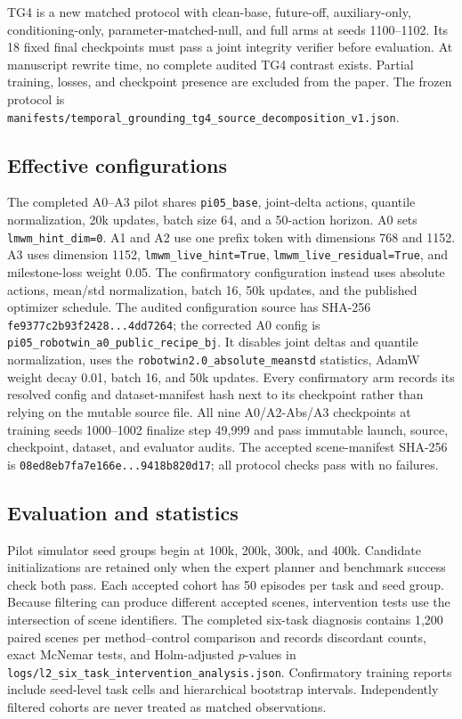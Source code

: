 TG4 is a new matched protocol with clean-base, future-off, auxiliary-only,
conditioning-only, parameter-matched-null, and full arms at seeds 1100--1102.
Its 18 fixed final checkpoints must pass a joint integrity verifier before
evaluation.  At manuscript rewrite time, no complete audited TG4 contrast
exists.  Partial training, losses, and checkpoint presence are excluded from
the paper.  The frozen protocol is
\texttt{manifests/temporal\_grounding\_tg4\_source\_decomposition\_v1.json}.

\subsection{Effective configurations}
The completed A0--A3 pilot shares \texttt{pi05\_base}, joint-delta actions,
quantile normalization, 20k updates, batch size 64, and a 50-action horizon.
A0 sets \texttt{lmwm\_hint\_dim=0}.  A1 and A2 use one prefix token with
dimensions 768 and 1152.  A3 uses dimension 1152,
\texttt{lmwm\_live\_hint=True}, \texttt{lmwm\_live\_residual=True}, and
milestone-loss weight 0.05.  The confirmatory configuration instead uses
absolute actions, mean/std normalization, batch 16, 50k updates, and the
published optimizer schedule.  The audited configuration source has SHA-256
\texttt{fe9377c2b93f2428...4dd7264}; the corrected A0 config is
\texttt{pi05\_robotwin\_a0\_public\_recipe\_bj}.  It disables joint deltas and
quantile normalization, uses the \texttt{robotwin2.0\_absolute\_meanstd}
statistics, AdamW weight decay 0.01, batch 16, and 50k updates.  Every
confirmatory arm records its resolved config and dataset-manifest hash next to
its checkpoint rather than relying on the mutable source file.  All nine
A0/A2-Abs/A3 checkpoints at training seeds 1000--1002 finalize step 49,999 and
pass immutable launch, source, checkpoint, dataset, and evaluator audits.  The
accepted scene-manifest SHA-256 is
\texttt{08ed8eb7fa7e166e...9418b820d17}; all protocol checks pass with no
failures.

\subsection{Evaluation and statistics}
Pilot simulator seed groups begin at 100k, 200k, 300k, and 400k.  Candidate
initializations are retained only when the expert planner and benchmark success
check both pass.  Each accepted cohort has 50 episodes per task and seed group.
Because filtering can produce different accepted scenes, intervention tests
use the intersection of scene identifiers.  The completed six-task diagnosis
contains 1,200 paired scenes per method--control comparison and records
discordant counts, exact McNemar tests, and Holm-adjusted $p$-values in
\texttt{logs/l2\_six\_task\_intervention\_analysis.json}.  Confirmatory
training reports include seed-level task cells and hierarchical bootstrap
intervals.  Independently filtered cohorts are never treated as matched
observations.

